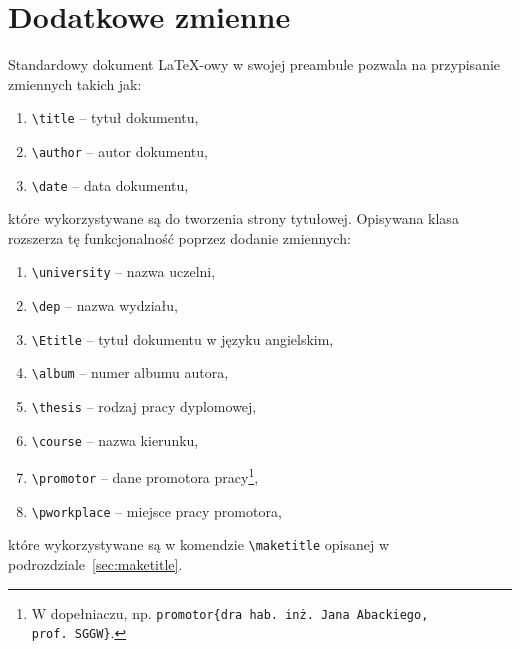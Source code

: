 \documentclass{SGGW-thesis}
\begin{document}
\section{Dodatkowe zmienne}
\label{sec:dodatkowe-zmienne}
Standardowy dokument \LaTeX-owy w swojej preambule pozwala na przypisanie zmiennych takich jak:
\begin{enumerate}[label=\alph*.]
\item{\verb|\title| -- tytuł dokumentu,}
\item{\verb|\author| -- autor dokumentu,}
\item{\verb|\date| -- data dokumentu,}
\end{enumerate}
które wykorzystywane są do tworzenia strony tytułowej. Opisywana klasa rozszerza tę funkcjonalność poprzez dodanie zmiennych:
\begin{enumerate}[label=\alph*.]
\item{\verb|\university| -- nazwa uczelni,}
\item{\verb|\dep| -- nazwa wydziału,}
\item{\verb|\Etitle| -- tytuł dokumentu w języku angielskim,}
\item{\verb|\album| -- numer albumu autora,}
\item{\verb|\thesis| -- rodzaj pracy dyplomowej,}
\item{\verb|\course| -- nazwa kierunku,}
\item{\verb|\promotor| -- dane promotora pracy}\footnote{W dopełniaczu, np. {\tt \tbs{}promotor\{dra hab. inż.\ Jana Abackiego, prof.\ SGGW\}}\usp{}.},
\item{\verb|\pworkplace| -- miejsce pracy promotora,}
\end{enumerate}
które wykorzystywane są w komendzie \verb|\maketitle| opisanej w podrozdziale~\ref{sec:maketitle}.
\end{document}
